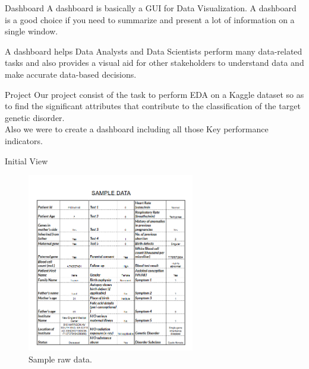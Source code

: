 \documentclass{beamer}
\begin{document}
	\begin{frame}{Dashboard}
		A dashboard is basically a GUI for Data Visualization. A dashboard is a good choice if you need to summarize and present a lot of information on a single window.\newline \newline
		
		A dashboard helps Data Analysts and Data Scientists perform many data-related tasks and also provides a visual aid for other stakeholders to understand data and make accurate data-based decisions.
	\end{frame}
	\begin{frame}{Project}
		Our project consist of the task to perform EDA on a Kaggle dataset so as to find the significant attributes that contribute to the classification of the target genetic disorder.\\
		Also we were to create a dashboard including all those Key performance indicators. 
	\end{frame}	
	\begin{frame}{Initial View}
		\begin{figure}
			\includegraphics[width=0.65\textwidth, height=0.72\textheight]{sample.png}
			\caption{Sample raw data.}
		\end{figure}
	\end{frame}
\end{document}
